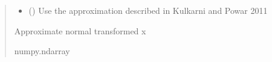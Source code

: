 \documentclass[letterpaper,10pt,english]{sphinxmanual}
\begin{document}
\begin{fulllineitems}
\begin{quote}
\begin{description}
\begin{itemize}
\item {}
\sphinxAtStartPar
{} () \textendash{} Use the approximation described in Kulkarni and Powar 2011

\end{itemize}

\sphinxAtStartPar
{} \textendash{} Approximate normal transformed x

\sphinxAtStartPar
numpy.ndarray

\end{description}\end{quote}

\end{fulllineitems}
\end{document}
